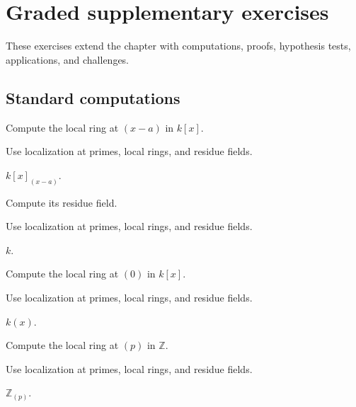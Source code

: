 \section{Graded supplementary exercises}
These exercises extend the chapter with computations, proofs, hypothesis tests, applications, and challenges.

\subsection*{Standard computations}

\begin{exercise}\label{exr:vi11-expand-01}
Compute the local ring at $(x-a)$ in $k[x]$.
\end{exercise}
\begin{hint}
Use localization at primes, local rings, and residue fields.
\end{hint}
\begin{solution}
$k[x]_{(x-a)}$.
\end{solution}

\begin{exercise}\label{exr:vi11-expand-02}
Compute its residue field.
\end{exercise}
\begin{hint}
Use localization at primes, local rings, and residue fields.
\end{hint}
\begin{solution}
$k$.
\end{solution}

\begin{exercise}\label{exr:vi11-expand-03}
Compute the local ring at $(0)$ in $k[x]$.
\end{exercise}
\begin{hint}
Use localization at primes, local rings, and residue fields.
\end{hint}
\begin{solution}
$k(x)$.
\end{solution}

\begin{exercise}\label{exr:vi11-expand-04}
Compute the local ring at $(p)$ in $\mathbb Z$.
\end{exercise}
\begin{hint}
Use localization at primes, local rings, and residue fields.
\end{hint}
\begin{solution}
$\mathbb Z_{(p)}$.
\end{solution}

